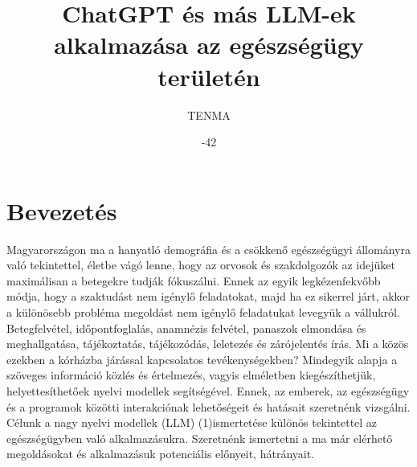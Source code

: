 \documentclass{article}
\begin{document}
\title{ChatGPT és más LLM-ek alkalmazása az egészségügy területén
}
\author{TENMA}
\date{-42}
\maketitle
\section{Bevezetés}
\begin{multicols}{2}
    Magyarországon ma a hanyatló demográfia és a csökkenő egészségügyi állományra való tekintettel, életbe vágó lenne, hogy az orvosok és szakdolgozók az idejüket maximálisan a betegekre tudják fókuszálni. Ennek az egyik legkézenfekvőbb módja, hogy a szaktudást nem igénylő feladatokat, majd ha ez sikerrel járt, akkor a különösebb probléma megoldást nem igénylő feladatukat levegyük a vállukról. 
    Betegfelvétel, időpontfoglalás, anamnézis felvétel, panaszok elmondása és meghallgatása, tájékoztatás, tájékozódás, leletezés és zárójelentés írás. Mi a közös ezekben a kórházba járással kapcsolatos tevékenységekben? Mindegyik alapja a szöveges információ közlés és értelmezés, vagyis elméletben kiegészíthetjük, helyettesíthetőek nyelvi modellek segítségével. Ennek, az emberek, az egészségügy és a programok közötti interakciónak lehetőségeit és hatásait szeretnénk vizsgálni. Célunk a nagy nyelvi modellek (LLM) (1)ismertetése különös tekintettel az egészségügyben való alkalmazásukra. Szeretnénk ismertetni a ma már elérhető megoldásokat és alkalmazásuk potenciális előnyeit, hátrányait. 
    
\end{multicols}
\end{document}
